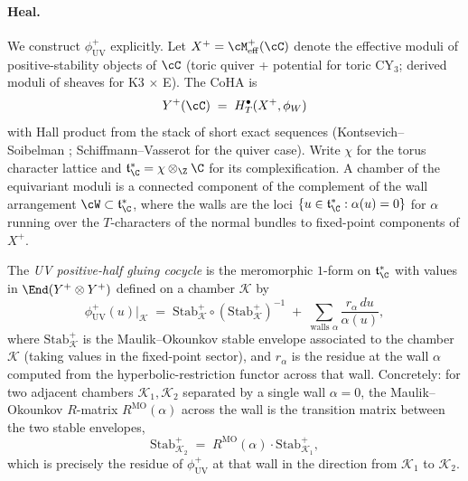 \paragraph{Heal.}  We construct $\phi^+_{\mathrm{UV}}$ explicitly.  Let
$X^+ = \cM^+_{\mathrm{eff}}(\cC)$ denote the effective moduli of
positive-stability objects of $\cC$ (toric quiver + potential for
toric CY$_3$; derived moduli of sheaves for K3 $\times$ E).  The
CoHA is
\[
 Y^+(\cC) \;=\; H^\bullet_T(X^+, \phi_W)
\]
with Hall product from the stack of short exact sequences (Kontsevich--
Soibelman \cite{KontsevichSoibelmanCoHA}; Schiffmann--Vasserot
\cite{SchiffmannVasserot2013} for the quiver case).  Write $\chi$ for
the torus character lattice and $\mathfrak{t}^*_\C =
\chi \otimes_\Z \C$ for its complexification.  A chamber of the
equivariant moduli is a connected component of the complement of the
wall arrangement $\cW \subset \mathfrak{t}^*_\C$, where the walls are
the loci $\{u \in \mathfrak{t}^*_\C : \alpha(u) = 0\}$ for $\alpha$
running over the $T$-characters of the normal bundles to fixed-point
components of $X^+$.

The \emph{UV positive-half gluing cocycle} is the meromorphic
$1$-form on $\mathfrak{t}^*_\C$ with values in $\End(Y^+ \otimes Y^+)$
defined on a chamber $\mathcal{K}$ by
\[
 \phi^+_{\mathrm{UV}}(u) \Big|_{\mathcal{K}}
 \;=\;
 \mathrm{Stab}_{\mathcal{K}}^+
 \circ (\mathrm{Stab}_{\mathcal{K}}^+)^{-1}
 \;+\;
 \sum_{\text{walls } \alpha} \frac{r_\alpha \, du}{\alpha(u)},
\]
where $\mathrm{Stab}_{\mathcal{K}}^+$ is the Maulik--Okounkov stable
envelope associated to the chamber $\mathcal{K}$ (taking values in
the fixed-point sector), and $r_\alpha$ is the residue at the wall
$\alpha$ computed from the hyperbolic-restriction functor across that
wall.  Concretely: for two adjacent chambers $\mathcal{K}_1,
\mathcal{K}_2$ separated by a single wall $\alpha = 0$, the
Maulik--Okounkov $R$-matrix $R^{\mathrm{MO}}(\alpha)$ across the wall
is the transition matrix between the two stable envelopes,
\[
 \mathrm{Stab}_{\mathcal{K}_2}^+ \;=\;
 R^{\mathrm{MO}}(\alpha) \cdot \mathrm{Stab}_{\mathcal{K}_1}^+,
\]
which is precisely the residue of $\phi^+_{\mathrm{UV}}$ at that wall
in the direction from $\mathcal{K}_1$ to $\mathcal{K}_2$.

